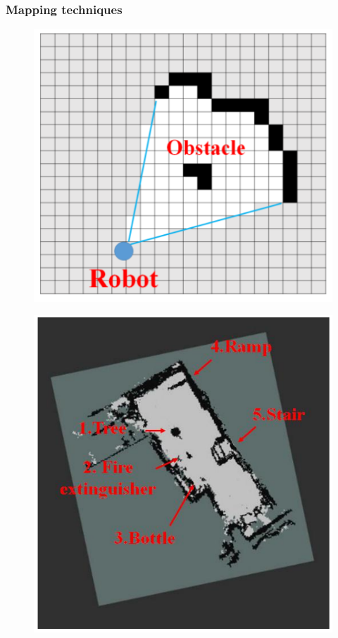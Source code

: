 \documentclass[12pt]{article}
\begin{document}
\subsubsection{Mapping techniques}
\begin{figure}[h]
    \centering
     \begin{minipage}{0.4\textwidth}
        \centering
        \includegraphics[width=\linewidth]{occupancy_grid} %
        \label{fig:simple_occ_grid}
    \end{minipage}\hfill
    \begin{minipage}{0.4\textwidth}
        \centering
        \includegraphics[width=\linewidth]{complex_occ_grid} %

\end{minipage}
\end{figure}
\end{document}
